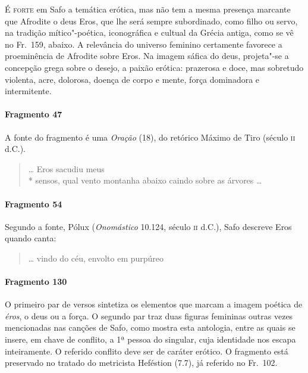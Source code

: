 \textsc{É forte} em Safo a temática erótica, mas não tem a mesma presença marcante que
Afrodite o deus Eros, que lhe será sempre subordinado, como filho ou servo, na
tradição mítico"-poética, iconográfica e cultual da Grécia antiga, como se vê no
Fr.~159, abaixo. A relevância do universo feminino certamente favorece a
proeminência de Afrodite sobre Eros. Na imagem sáfica do deus, projeta"-se a
concepção grega sobre o desejo, a paixão erótica: prazerosa e doce, mas
sobretudo violenta, acre, dolorosa, doença de corpo e mente, força dominadora e
intermitente.

\paragraph{Fragmento 47}

{\small A fonte do fragmento é uma \textit{Oração} (18), do retórico Máximo de Tiro (século
\textsc{ii} d.C.).}

\begin{verse}
\ldots{} Eros sacudiu meus\\*
sensos, qual vento montanha abaixo caindo \qb{}sobre as árvores \ldots{}
\end{verse}

\paragraph{Fragmento 54}

{\small Segundo a fonte, Pólux (\textit{Onomástico} 10.124, século \textsc{ii} d.C.), Safo descreve Eros
quando canta:}

\begin{verse}
\ldots{} vindo do céu, envolto em purpúreo 
\end{verse}

\paragraph{Fragmento 130}

{\small O primeiro par de versos sintetiza os elementos que marcam a imagem poética de
\textit{éros}, o deus ou a força. O segundo par traz duas figuras femininas
outras vezes mencionadas nas canções de Safo, como mostra esta antologia, entre
as quais se insere, em chave de conflito, a 1ª pessoa do singular, cuja
identidade nos escapa inteiramente. O referido conflito deve ser de caráter
erótico. O fragmento está preservado no tratado do metricista Heféstion (7.7), já
referido no Fr.~102.}

